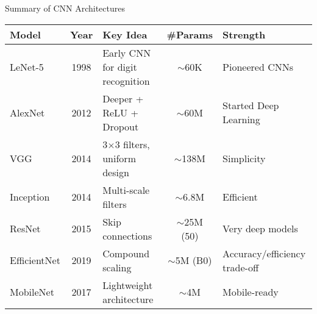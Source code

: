 \begin{frame}{Summary of CNN Architectures}
    \begin{minipage}{0.8\linewidth}
    \centering
    \small
    \begin{tabular}{|l|c|l|c|l|}
        \hline
        \textbf{Model} & \textbf{Year} & \textbf{Key Idea} & \textbf{\#Params} & \textbf{Strength} \\
        \hline
        LeNet-5 & 1998 & Early CNN for digit recognition & $\sim$60K & Pioneered CNNs \\
        AlexNet & 2012 & Deeper + ReLU + Dropout & $\sim$60M & Started Deep Learning \\
        VGG & 2014 & 3$\times$3 filters, uniform design & $\sim$138M & Simplicity \\
        Inception & 2014 & Multi-scale filters & $\sim$6.8M & Efficient \\
        ResNet & 2015 & Skip connections & $\sim$25M (50) & Very deep models \\
        EfficientNet & 2019 & Compound scaling & $\sim$5M (B0) & Accuracy/efficiency trade-off \\
        MobileNet & 2017 & Lightweight architecture & $\sim$4M & Mobile-ready \\
        \hline
    \end{tabular}
    \end{minipage}
\end{frame}
